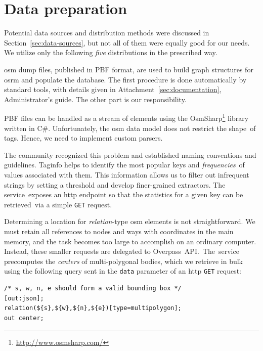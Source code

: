 \section{Data preparation}\label{sec:data-preparation}


Potential data sources and distribution methods were discussed in Section~\ref{sec:data-sources}, but not all of them were equally good for our needs. We utilize only the following \emph{five} distributions in the prescribed way.

\acs{osm} dump files, published in PBF format, are used to build graph structures for \acs{osrm} and populate the database. The first procedure is done automatically by standard tools, with details given in Attachment~\ref{sec:documentation}, Administrator's guide. The other part is our responsibility.

PBF files can be handled as a stream of elements using the OsmSharp\footnote{\href{http://www.osmsharp.com/}{http://www.osmsharp.com/}} library written in C\#. Unfortunately, the \acs{osm} data model does not restrict the shape~of tags. Hence, we need to implement custom parsers.

The community recognized this problem and established naming conventions and guidelines. Taginfo helps to identify the most popular keys and \emph{frequencies}~of values associated with them. This information allows us to filter out infrequent strings by setting a threshold and develop finer-grained extractors. The service~ex\-pos\-es an \acs{http} endpoint so that the statistics for a given key can be retrieved~via a simple \texttt{GET} request.

Determining a location for \emph{relation}-type \acs{osm} elements is not straightforward. We must retain all references to nodes and ways with coordinates in the main memory, and the task becomes too large to accomplish on an ordinary computer. Instead, these smaller requests are delegated to Overpass~API.~The~service precomputes the \emph{centers} of multi-polygonal bodies, which we retrieve in bulk using the following query sent in the \texttt{data} parameter of an \acs{http} \texttt{GET} request:

\begin{verbatim}
/* s, w, n, e should form a valid bounding box */
[out:json];
relation(${s},${w},${n},${e})[type=multipolygon];
out center;
\end{verbatim}

